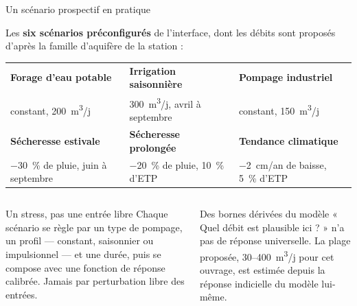 \documentclass[aspectratio=169,11pt]{beamer}
\begin{document}
\begin{frame}{Un scénario prospectif en pratique}

\vspace{0.1cm}
{\footnotesize Les \textbf{six scénarios préconfigurés} de l'interface, dont les débits sont
proposés d'après la famille d'aquifère de la station :\par}
\vspace{0.15em}
{\scriptsize
\begin{tabularx}{\linewidth}{@{}YYY@{}}
\textbf{Forage d'eau potable} & \textbf{Irrigation saisonnière} & \textbf{Pompage industriel} \\
constant, \num{200}~m\textsuperscript{3}/j & \num{300}~m\textsuperscript{3}/j, avril à septembre &
constant, \num{150}~m\textsuperscript{3}/j \\[0.35em]
\textbf{Sécheresse estivale} & \textbf{Sécheresse prolongée} & \textbf{Tendance climatique} \\
\SI{-30}{\percent} de pluie, juin à septembre & \SI{-20}{\percent} de pluie, \SI{+10}{\percent}
d'ETP & \num{-2}~cm/an de baisse, \SI{+5}{\percent} d'ETP \\
\end{tabularx}\par}

\vspace{0.35cm}
\begin{columns}[T]
\begin{column}{0.47\textwidth}
\small
\begin{apport}{Un stress, pas une entrée libre}
Chaque scénario se règle par un type de pompage, un profil — constant, saisonnier ou
impulsionnel — et une durée, puis se compose avec une fonction de réponse calibrée. Jamais par
perturbation libre des entrées.
\end{apport}
\end{column}

\begin{column}{0.47\textwidth}
\small
\begin{apport}{Des bornes dérivées du modèle}
« Quel débit est plausible ici ? » n'a pas de réponse universelle. La plage proposée,
\numrange{30}{400}~m\textsuperscript{3}/j pour cet ouvrage, est estimée depuis la réponse
indicielle du modèle lui-même.
\end{apport}
\end{column}
\end{columns}
\end{frame}
\end{document}
